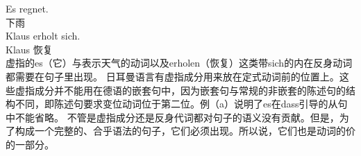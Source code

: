 \eal
\ex\label{Beispiel-es-regnet}
\gll Es regnet.\\
     \expl{} 下雨\\
\ex\label{Beispiel-erholt-sich}
\gll Klaus erholt sich.\\
     Klaus 恢复 \\
\zl
虚指的es（它）与表示天气的动词以及erholen（恢复）这类带sich的内在反身动词都需要在句子里出现。
日耳曼语言有虚指成分用来放在定式动词前的位置上。这些虚指成分并不能用在德语的嵌套句中，因为嵌套句与常规的非嵌套的陈述句的结构不同，即陈述句要求变位动词位于第二位。例（a）说明了es在dass引导的从句中不能省略。
\eal
{}
\zl
不管是虚指成分还是反身代词都对句子的语义没有贡献。但是，为了构成一个完整的、合乎语法的句子，它们必须出现。所以说，它们也是动词的价的一部分。

